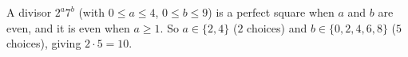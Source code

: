 A divisor $2^a7^b$ (with $0\le a\le4$, $0\le b\le9$) is a perfect square when $a$ and $b$ are even, and it is even when $a\ge1$. So $a\in\{2,4\}$ ($2$ choices) and $b\in\{0,2,4,6,8\}$ ($5$ choices), giving $2\cdot5=\boxed{10}$.
